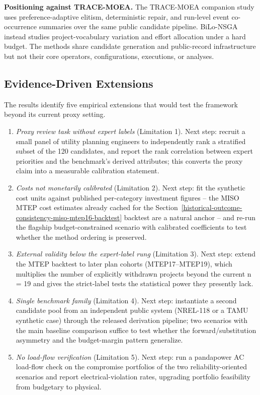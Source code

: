 \documentclass[applsci,article,submit,moreauthors]{Definitions/mdpi}
\providecommand{\tightlist}{\setlength{\itemsep}{0pt}\setlength{\parskip}{0pt}}
\begin{document}
\textbf{Positioning against TRACE-MOEA.} The TRACE-MOEA companion study \cite{ref33} uses preference-adaptive elitism, deterministic repair, and run-level event co-occurrence summaries over the same public candidate pipeline. BiLo-NSGA instead studies project-vocabulary variation and effort allocation under a hard budget. The methods share candidate generation and public-record infrastructure but not their core operators, configurations, executions, or analyses.

\subsection{Evidence-Driven Extensions}\label{evidence-driven-extensions}

The results identify five empirical extensions that would test the framework beyond its current proxy setting.

\begin{enumerate}
\def\labelenumi{\arabic{enumi}.}
\tightlist
\item
  \emph{Proxy review task without expert labels} (Limitation 1). Next step: recruit a small panel of utility planning engineers to independently rank a stratified subset of the 120 candidates, and report the rank correlation between expert priorities and the benchmark's derived attributes; this converts the proxy claim into a measurable calibration statement.
\item
  \emph{Costs not monetarily calibrated} (Limitation 2). Next step: fit the synthetic cost units against published per-category investment figures -- the MISO MTEP cost estimates already cached for the Section~\ref{historical-outcome-consistency-miso-mtep16-backtest} backtest are a natural anchor -- and re-run the flagship budget-constrained scenario with calibrated coefficients to test whether the method ordering is preserved.
\item
  \emph{External validity below the expert-label rung} (Limitation 3). Next step: extend the MTEP backtest to later plan cohorts (MTEP17--MTEP19), which multiplies the number of explicitly withdrawn projects beyond the current n = 19 and gives the strict-label tests the statistical power they presently lack.
\item
  \emph{Single benchmark family} (Limitation 4). Next step: instantiate a second candidate pool from an independent public system (NREL-118 or a TAMU synthetic case) through the released derivation pipeline; two scenarios with the main baseline comparison suffice to test whether the forward/substitution asymmetry and the budget-margin pattern generalize.
\item
  \emph{No load-flow verification} (Limitation 5). Next step: run a pandapower AC load-flow check on the compromise portfolios of the two reliability-oriented scenarios and report electrical-violation rates, upgrading portfolio feasibility from budgetary to physical.
\end{enumerate}
\end{document}
